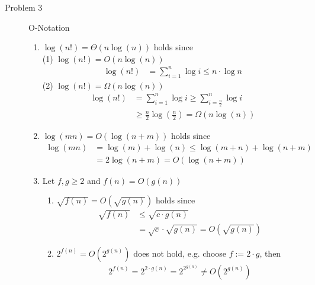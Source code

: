 \documentclass[11pt,a4paper,ngerman]{article}
\begin{document}
\begin{description}
\item[Problem 3] O-Notation
  \begin{enumerate}
    \item $\log(n!) = \Theta(n \log(n))$ holds since\\
          (1) $\log(n!) = O(n \log(n))$ \\
              \begin{equation}\begin{split}
                \log(n!) &= \sum_{i=1}^n {\log i} 
                         \leq n \cdot \log n
              \end{split}\end{equation}
          (2) $\log(n!) = \Omega(n \log(n))$ \\
              \begin{equation}\begin{split}
                \log(n!) &= \sum_{i=1}^n {\log i} \geq \sum_{i=\frac{n}{2}}^n {\log i} \\
                         &\geq \frac{n}{2} \log(\frac{n}{2}) = \Omega(n \log(n))
              \end{split}\end{equation}
    \item $\log(mn) = O(\log(n+m))$ holds since
      \begin{equation}\begin{split}
        \log(mn) &= \log(m) + \log(n) \leq \log(m+n) + \log(n+m)\\
                 &= 2 \log(n+m) = O(\log(n+m))
      \end{split}\end{equation}
  
    \item Let $f,g \geq 2$ and $f(n) = O(g(n))$
    \begin{enumerate}
      \item $\sqrt{f(n)} = O(\sqrt{g(n)})$ holds since
            \begin{equation}\begin{split}
              \sqrt{f(n)} &\leq \sqrt{c\cdot g(n)}\\
                          &= \sqrt{c}\cdot \sqrt{g(n)} = O(\sqrt{g(n)})
            \end{split}\end{equation}
      \item $2^{f(n)} = O(2^{g(n)})$ does not hold, e.g. choose $f := 2\cdot g$, then
            \begin{equation}\begin{split}
              2^{f(n)} = 2^{2\cdot g(n)} = 2^{2^{g(n)}} \neq O(2^{g(n)})
            \end{split}\end{equation}
    \end{enumerate}
  \end{enumerate}

\end{description}

\label{LastPage}
\end{document}
